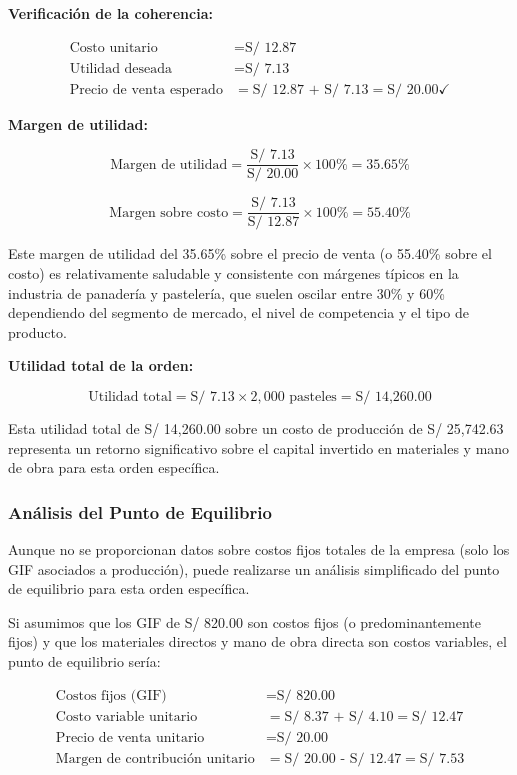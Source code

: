 \documentclass[
  stu,
  floatsintext,
  longtable,
  a4paper,
  nolmodern,
  notxfonts,
  notimes,
  12pt,
  colorlinks=true,linkcolor=blue,citecolor=blue,urlcolor=blue]{apa7}
\begin{document}
\textbf{Verificación de la coherencia:}

\[
\begin{aligned}
\text{Costo unitario} &= \text{S/ 12.87} \\
\text{Utilidad deseada} &= \text{S/ 7.13} \\
\text{Precio de venta esperado} &= \text{S/ 12.87 + S/ 7.13} = \text{S/ 20.00} \checkmark
\end{aligned}
\]

\textbf{Margen de utilidad:}

\[
\text{Margen de utilidad} = \frac{\text{S/ 7.13}}{\text{S/ 20.00}} \times 100\% = 35.65\%
\]

\[
\text{Margen sobre costo} = \frac{\text{S/ 7.13}}{\text{S/ 12.87}} \times 100\% = 55.40\%
\]

Este margen de utilidad del 35.65\% sobre el precio de venta (o 55.40\%
sobre el costo) es relativamente saludable y consistente con márgenes
típicos en la industria de panadería y pastelería, que suelen oscilar
entre 30\% y 60\% dependiendo del segmento de mercado, el nivel de
competencia y el tipo de producto.

\textbf{Utilidad total de la orden:}

\[
\text{Utilidad total} = \text{S/ 7.13} \times 2,000 \text{ pasteles} = \text{S/ 14,260.00}
\]

Esta utilidad total de S/ 14,260.00 sobre un costo de producción de S/
25,742.63 representa un retorno significativo sobre el capital invertido
en materiales y mano de obra para esta orden específica.

\subsubsection{Análisis del Punto de
Equilibrio}\label{anuxe1lisis-del-punto-de-equilibrio}

Aunque no se proporcionan datos sobre costos fijos totales de la empresa
(solo los GIF asociados a producción), puede realizarse un análisis
simplificado del punto de equilibrio para esta orden específica.

Si asumimos que los GIF de S/ 820.00 son costos fijos (o
predominantemente fijos) y que los materiales directos y mano de obra
directa son costos variables, el punto de equilibrio sería:

\[
\begin{aligned}
\text{Costos fijos (GIF)} &= \text{S/ 820.00} \\
\text{Costo variable unitario} &= \text{S/ 8.37 + S/ 4.10} = \text{S/ 12.47} \\
\text{Precio de venta unitario} &= \text{S/ 20.00} \\
\text{Margen de contribución unitario} &= \text{S/ 20.00 - S/ 12.47} = \text{S/ 7.53}
\end{aligned}
\]
\end{document}
